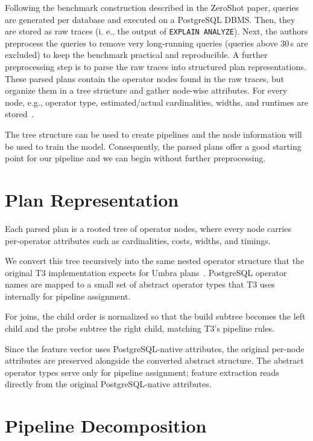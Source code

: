 Following the benchmark construction described in the ZeroShot paper, queries are generated per database and executed on a PostgreSQL DBMS.
Then, they are stored as raw traces (i. e., the output of \texttt{EXPLAIN ANALYZE}).
Next, the authors preprocess the queries to remove very long-running queries (queries above 30\,s are excluded) to keep the benchmark practical and reproducible.
A further preprocessing step is to parse the raw traces into structured plan representations.
These parsed plans contain the operator nodes found in the raw traces, but organize them in a tree structure and gather node-wise attributes.
For every node, e.g., operator type, estimated/actual cardinalities, widths, and runtimes are stored~\parencite{zeroshot}.

The tree structure can be used to create pipelines and the node information will be used to train the model.
Consequently, the parsed plans offer a good starting point for our pipeline and we can begin without further preprocessing.



\section{Plan Representation}

Each parsed plan is a rooted tree of operator nodes, where every node carries per-operator attributes such as cardinalities, costs, widths, and timings.

We convert this tree recursively into the same nested operator structure that the original T3 implementation expects for Umbra plans~\parencite{t3}.
PostgreSQL operator names are mapped to a small set of abstract operator types that T3 uses internally for pipeline assignment.

For joins, the child order is normalized so that the build subtree becomes the left child and the probe subtree the right child, matching T3's pipeline rules.

Since the feature vector uses PostgreSQL-native attributes, the original per-node attributes are preserved alongside the converted abstract structure.
The abstract operator types serve only for pipeline assignment; feature extraction reads directly from the original PostgreSQL-native attributes.

\section{Pipeline Decomposition}

